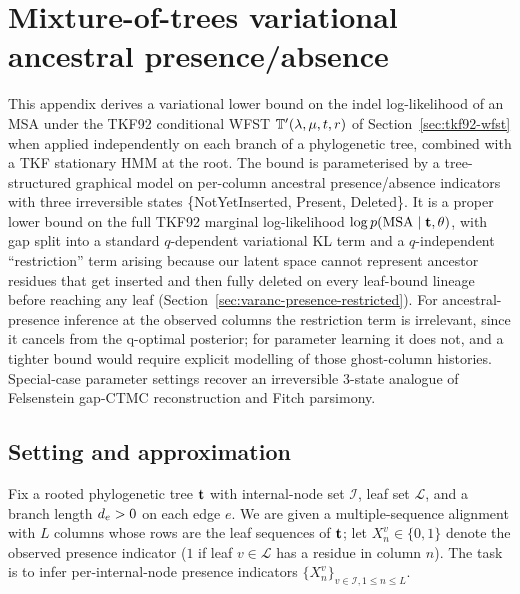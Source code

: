 
\section{Mixture-of-trees variational ancestral presence/absence}
\label{sec:varanc-presence}

This appendix derives a variational lower bound on the indel
log-likelihood of an MSA under the TKF92 conditional WFST
$\mathbb{T}'(\lambda,\mu,t,r)$ of
Section~\ref{sec:tkf92-wfst} when applied independently
on each branch of a phylogenetic tree, combined with a
TKF stationary HMM at the root.
The bound is parameterised by a tree-structured graphical model
on per-column ancestral presence/absence indicators with three
irreversible states \{NotYetInserted, Present, Deleted\}.
It is a proper lower bound on the full TKF92 marginal
log-likelihood $\log p(\text{MSA} \mid \mathbf{t}, \theta)$, with
gap split into a standard $q$-dependent variational
KL term and a $q$-independent ``restriction'' term arising because
our latent space cannot represent ancestor residues that get
inserted and then fully deleted on every leaf-bound lineage before
reaching any leaf
(Section~\ref{sec:varanc-presence-restricted}).
For ancestral-presence inference at the observed columns the
restriction term is irrelevant, since it cancels from the q-optimal
posterior;
for parameter learning it does not, and a tighter bound would
require explicit modelling of those ghost-column histories.
Special-case parameter settings recover an irreversible 3-state
analogue of Felsenstein gap-CTMC reconstruction and Fitch parsimony.

\subsection{Setting and approximation}
\label{sec:varanc-presence-setting}

Fix a rooted phylogenetic tree $\mathbf{t}$ with internal-node set
$\mathcal{I}$, leaf set $\mathcal{L}$, and a branch length
$d_e > 0$ on each edge $e$.
We are given a multiple-sequence alignment with $L$ columns whose rows
are the leaf sequences of $\mathbf{t}$;
let $X^v_n \in \{0,1\}$ denote the observed presence indicator
($1$ if leaf $v \in \mathcal{L}$ has a residue in column $n$).
The task is to infer per-internal-node presence indicators
$\{X^v_n\}_{v \in \mathcal{I}, 1 \le n \le L}$.

